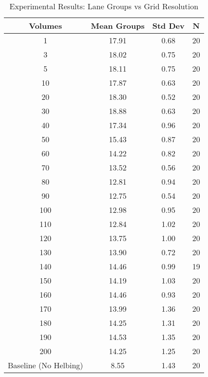 \begin{table}[h]
\centering
\caption{Experimental Results: Lane Groups vs Grid Resolution}
\label{tab:breaking_lanes}
\begin{tabular}{cccc}
\hline
Volumes & Mean Groups & Std Dev & N \\
\hline
1 & 17.91 & 0.68 & 20 \\
3 & 18.02 & 0.75 & 20 \\
5 & 18.11 & 0.75 & 20 \\
10 & 17.87 & 0.63 & 20 \\
20 & 18.30 & 0.52 & 20 \\
30 & 18.88 & 0.63 & 20 \\
40 & 17.34 & 0.96 & 20 \\
50 & 15.43 & 0.87 & 20 \\
60 & 14.22 & 0.82 & 20 \\
70 & 13.52 & 0.56 & 20 \\
80 & 12.81 & 0.94 & 20 \\
90 & 12.75 & 0.54 & 20 \\
100 & 12.98 & 0.95 & 20 \\
110 & 12.84 & 1.02 & 20 \\
120 & 13.75 & 1.00 & 20 \\
130 & 13.90 & 0.72 & 20 \\
140 & 14.46 & 0.99 & 19 \\
150 & 14.19 & 1.03 & 20 \\
160 & 14.46 & 0.93 & 20 \\
170 & 13.99 & 1.36 & 20 \\
180 & 14.25 & 1.31 & 20 \\
190 & 14.53 & 1.35 & 20 \\
200 & 14.25 & 1.25 & 20 \\
\hline
Baseline (No Helbing) & 8.55 & 1.43 & 20 \\
\hline
\end{tabular}
\end{table}

